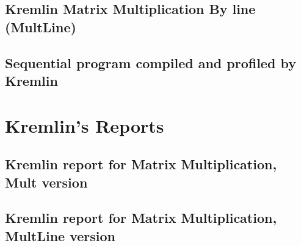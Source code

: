 
	
\subsection{Kremlin Matrix Multiplication By line (MultLine)}



\subsection{Sequential program compiled and profiled by Kremlin}




\section{Kremlin's Reports}

\subsection{Kremlin report for Matrix Multiplication, Mult version }



\subsection{Kremlin report for Matrix Multiplication, MultLine version }




